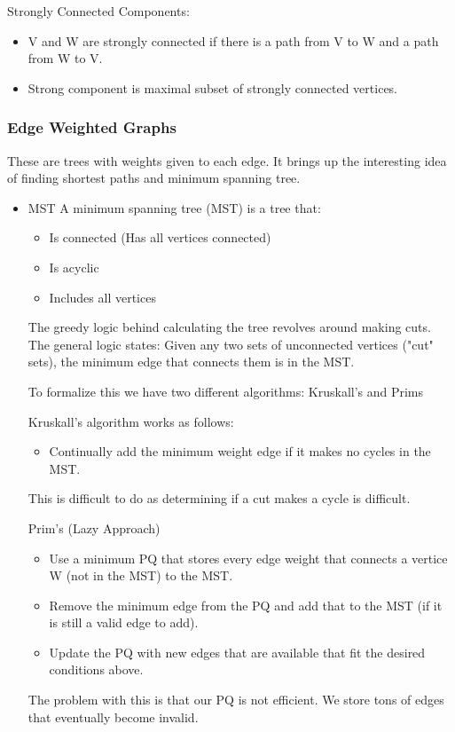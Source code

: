 \documentclass[11pt]{article}
\begin{document}
Strongly Connected Components:
\begin{itemize}
\item V and W are strongly connected if there is a path from V to W and a path from W to V.
\item Strong component is maximal subset of strongly connected vertices.
\end{itemize}

\subsubsection*{Edge Weighted Graphs}
\label{sec:orgf13f43a}
These are trees with weights given to each edge.
It brings up the interesting idea of finding shortest paths and minimum spanning tree.

\begin{itemize}
\item MST
\label{sec:org83d469b}
A minimum spanning tree (MST) is a tree that:
\begin{itemize}
\item Is connected (Has all vertices connected)
\item Is acyclic
\item Includes all vertices
\end{itemize}

The greedy logic behind calculating the tree revolves around making cuts. The general logic states:
Given any two sets of unconnected vertices ("cut" sets), the minimum edge that connects them is in the MST.

To formalize this we have two different algorithms: Kruskall's and Prims

Kruskall's algorithm works as follows:
\begin{itemize}
\item Continually add the minimum weight edge if it makes no cycles in the MST.
\end{itemize}
This is difficult to do as determining if a cut makes a cycle is difficult.

Prim's (Lazy Approach)
\begin{itemize}
\item Use a minimum PQ that stores every edge weight that connects a vertice W (not in the MST) to the MST.
\item Remove the minimum edge from the PQ and add that to the MST (if it is still a valid edge to add).
\item Update the PQ with new edges that are available that fit the desired conditions above.
\end{itemize}
The problem with this is that our PQ is not efficient. We store tons of edges that eventually become invalid.


\end{itemize}
\end{document}
